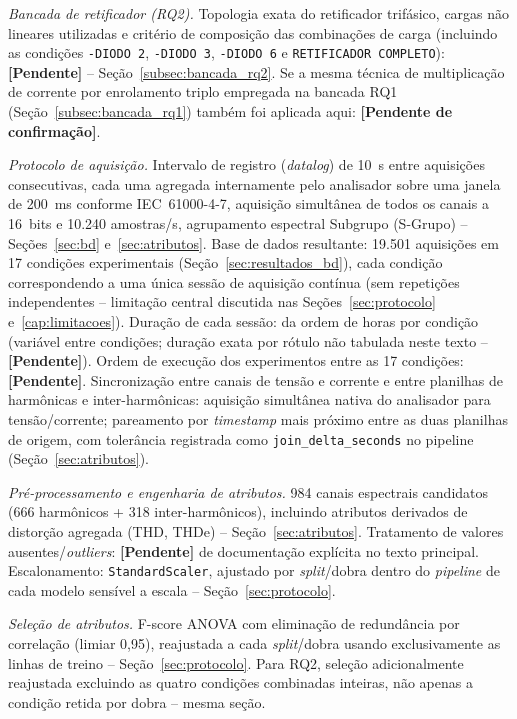 \documentclass[times,final]{elsarticle}
\begin{document}
{\textit{Bancada de retificador (RQ2).} Topologia exata do retificador trifásico, cargas não lineares utilizadas e critério de composição das combinações de carga (incluindo as condições \texttt{-DIODO~2}, \texttt{-DIODO~3}, \texttt{-DIODO~6} e \texttt{RETIFICADOR~COMPLETO}): \textbf{[Pendente]} -- Seção~\ref{subsec:bancada_rq2}. Se a mesma técnica de multiplicação de corrente por enrolamento triplo empregada na bancada RQ1 (Seção~\ref{subsec:bancada_rq1}) também foi aplicada aqui: \textbf{[Pendente de confirmação]}.

\textit{Protocolo de aquisição.} Intervalo de registro (\textit{datalog}) de 10~s entre aquisições consecutivas, cada uma agregada internamente pelo analisador sobre uma janela de 200~ms conforme IEC~61000-4-7, aquisição simultânea de todos os canais a 16~bits e 10.240 amostras/s, agrupamento espectral Subgrupo (S-Grupo) -- Seções~\ref{sec:bd} e~\ref{sec:atributos}. Base de dados resultante: 19.501 aquisições em 17 condições experimentais (Seção~\ref{sec:resultados_bd}), cada condição correspondendo a uma única sessão de aquisição contínua (sem repetições independentes -- limitação central discutida nas Seções~\ref{sec:protocolo} e~\ref{cap:limitacoes}). Duração de cada sessão: da ordem de horas por condição (variável entre condições; duração exata por rótulo não tabulada neste texto -- \textbf{[Pendente]}). Ordem de execução dos experimentos entre as 17 condições: \textbf{[Pendente]}. Sincronização entre canais de tensão e corrente e entre planilhas de harmônicas e inter-harmônicas: aquisição simultânea nativa do analisador para tensão/corrente; pareamento por \textit{timestamp} mais próximo entre as duas planilhas de origem, com tolerância registrada como \texttt{join\_delta\_seconds} no pipeline (Seção~\ref{sec:atributos}).

\textit{Pré-processamento e engenharia de atributos.} 984 canais espectrais candidatos (666 harmônicos + 318 inter-harmônicos), incluindo atributos derivados de distorção agregada (THD, THDe) -- Seção~\ref{sec:atributos}. Tratamento de valores ausentes/\textit{outliers}: \textbf{[Pendente]} de documentação explícita no texto principal. Escalonamento: \texttt{StandardScaler}, ajustado por \textit{split}/dobra dentro do \textit{pipeline} de cada modelo sensível a escala -- Seção~\ref{sec:protocolo}.

\textit{Seleção de atributos.} F-score ANOVA com eliminação de redundância por correlação (limiar 0,95), reajustada a cada \textit{split}/dobra usando exclusivamente as linhas de treino -- Seção~\ref{sec:protocolo}. Para RQ2, seleção adicionalmente reajustada excluindo as quatro condições combinadas inteiras, não apenas a condição retida por dobra -- mesma seção.

}
\end{document}
